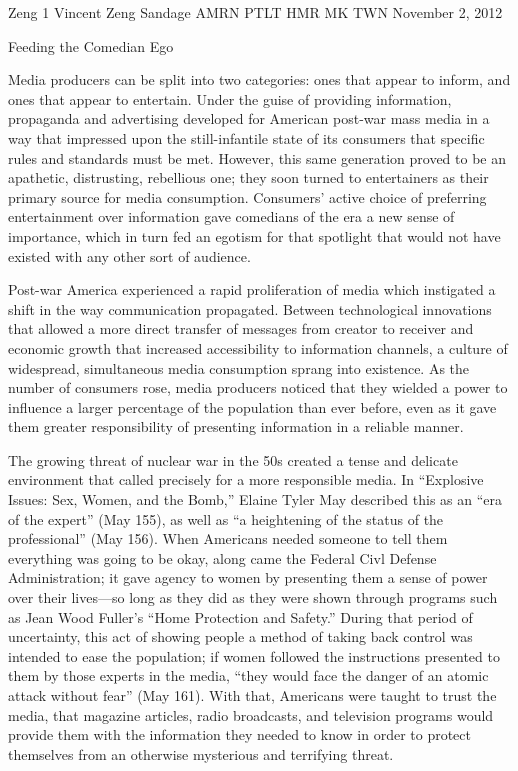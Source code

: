 Zeng 1
Vincent Zeng
Sandage
AMRN PTLT HMR MK TWN
November 2, 2012

Feeding the Comedian Ego

Media producers can be split into two categories: ones that appear to inform,
and ones that appear to entertain. Under the guise of providing information,
propaganda and advertising developed for American post-war mass media in a way
that impressed upon the still-infantile state of its consumers that specific
rules and standards must be met. However, this same generation proved to be an
apathetic, distrusting, rebellious one; they soon turned to entertainers as
their primary source for media consumption. Consumers' active choice of
preferring entertainment over information gave comedians of the era a new sense
of importance, which in turn fed an egotism for that spotlight that would not
have existed with any other sort of audience.

Post-war America experienced a rapid proliferation of media which instigated a
shift in the way communication propagated. Between technological innovations
that allowed a more direct transfer of messages from creator to receiver and
economic growth that increased accessibility to information channels, a culture
of widespread, simultaneous media consumption sprang into existence. As the
number of consumers rose, media producers noticed that they wielded a power to
influence a larger percentage of the population than ever before, even as it
gave them greater responsibility of presenting information in a reliable manner.

The growing threat of nuclear war in the 50s created a tense and delicate
environment that called precisely for a more responsible media. In ``Explosive
Issues: Sex, Women, and the Bomb,'' Elaine Tyler May described this as an ``era of
the expert'' (May 155), as well as ``a heightening of the status of the
professional'' (May 156). When Americans needed someone to tell them everything
was going to be okay, along came the Federal Civl Defense Administration; it
gave agency to women by presenting them a sense of power over their lives—so
long as they did as they were shown through programs such as Jean Wood Fuller's
``Home Protection and Safety.'' During that period of uncertainty, this act of
showing people a method of taking back control was intended to ease the
population; if women followed the instructions presented to them by those
experts in the media, ``they would face the danger of an atomic attack without
fear'' (May 161).  With that, Americans were taught to trust the media, that
magazine articles, radio broadcasts, and television programs would provide them
with the information they needed to know in order to protect themselves from an
otherwise mysterious and terrifying threat.

